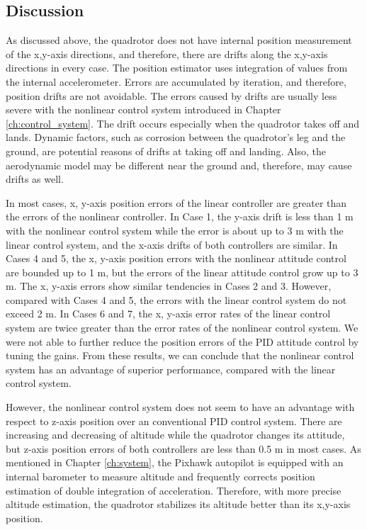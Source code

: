 \subsection{Discussion}
As discussed above, the quadrotor does not have internal position measurement of the x,y-axis directions, and therefore, there are drifts along the x,y-axis directions in every case. The position estimator uses integration of values from the internal accelerometer. Errors are accumulated by iteration, and therefore, position drifts are not avoidable. The errors caused by drifts are usually less severe with the nonlinear control system introduced in Chapter \ref{ch:control_system}. The drift occurs especially when the quadrotor takes off and lands. Dynamic factors, such as corrosion between the quadrotor's leg and the ground, are potential reasons of drifts at taking off and landing. Also, the aerodynamic model may be different near the ground and, therefore, may cause drifts as well.

In most cases, x, y-axis position errors of the linear controller are greater than the errors of the nonlinear controller. In Case 1, the y-axis drift is less than 1 m with the nonlinear control system while the error is about up to 3 m with the linear control system, and the x-axis drifts of both controllers are similar. In Cases 4 and 5, the x, y-axis position errors with the nonlinear attitude control are bounded up to 1 m, but the errors of the linear attitude control grow up to 3 m. The x, y-axis errors show similar tendencies in Cases 2 and 3. However, compared with Cases 4 and 5, the errors with the linear control system do not exceed 2 m. In Cases 6 and 7, the x, y-axis error rates of the linear control system are twice greater than the error rates of the nonlinear control system. We were not able to further reduce the position errors of the PID attitude control by tuning the gains. From these results, we can conclude that the nonlinear control system has an advantage of superior performance, compared with the linear control system.

However, the nonlinear control system does not seem to have an advantage with respect to z-axis position over an conventional PID control system. There are increasing and decreasing of altitude while the quadrotor changes its attitude, but z-axis position errors of both controllers are less than 0.5 m in most cases. As mentioned in Chapter \ref{ch:system}, the Pixhawk autopilot is equipped with an internal barometer to measure altitude and frequently corrects position estimation of double integration of acceleration. Therefore, with more precise altitude estimation, the quadrotor stabilizes its altitude better than its x,y-axis position.

